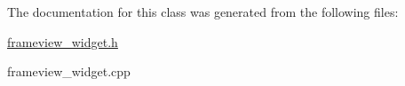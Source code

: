The documentation for this class was generated from the following files\+:\begin{DoxyCompactItemize}
\item 
\hyperlink{frameview__widget_8h}{frameview\+\_\+widget.\+h}\item 
frameview\+\_\+widget.\+cpp\end{DoxyCompactItemize}
